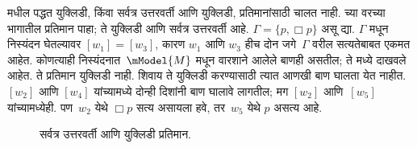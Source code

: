 \documentclass[../../../include/open-logic-section]{subfiles}
\begin{document}


 मधील पद्धत युक्लिडी, किंवा
सर्वत्र उत्तरवर्ती आणि युक्लिडी, प्रतिमानांसाठी
चालत नाही.  च्या वरच्या भागातील
प्रतिमान पाहा; ते युक्लिडी आणि सर्वत्र उत्तरवर्ती आहे.
$\Gamma = \{p, \Box p \}$ असू द्या. $\Gamma$ मधून
निस्यंदन घेतल्यावर $[w_1] = [w_3]$, कारण $w_1$
आणि $w_3$ हीच दोन जगे~$\Gamma$ वरील सत्यतेबाबत
एकमत आहेत. कोणत्याही निस्यंदनात~$\mModel{M}$
मधून वारशाने आलेले बाणही असतील; ते
 मध्ये दाखवले आहेत. ते प्रतिमान
युक्लिडी नाही. शिवाय ते युक्लिडी करण्यासाठी
त्यात आणखी बाण घालता येत नाहीत. $[w_2]$
आणि $[w_4]$ यांच्यामध्ये दोन्ही दिशांनी बाण
घालावे लागतील; मग $[w_2]$ आणि~$[w_5]$
यांच्यामध्येही. पण~$w_2$ येथे $\Box p$ सत्य
असायला हवे, तर~$w_5$ येथे $p$ असत्य आहे.

\begin{figure}[htpb]
  \centering
  \caption{सर्वत्र उत्तरवर्ती आणि युक्लिडी प्रतिमान.}
\end{figure}
\end{document}
